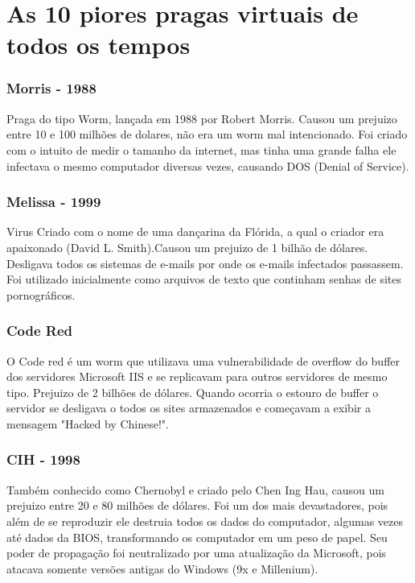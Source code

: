 \chapter{As 10 piores pragas virtuais de todos os tempos}

\subsection{Morris - 1988}

	Praga do tipo Worm, lançada em 1988 por Robert Morris. Causou um prejuizo entre 10 e 100 milhões de dolares, não era um worm mal intencionado. Foi criado com o intuito de medir o tamanho da internet, mas tinha uma grande falha ele infectava o mesmo computador diversas vezes, causando DOS (Denial of Service).

\subsection{Melissa - 1999}
	Virus Criado com o nome de uma dançarina da Flórida, a qual o criador era apaixonado (David L. Smith).Causou um prejuizo de 1 bilhão de dólares. Desligava todos os sistemas de e-mails por onde os e-mails infectados passassem. Foi utilizado inicialmente como arquivos de texto que continham senhas de sites pornográficos.

\subsection{Code Red}

	O Code red é um worm que utilizava uma vulnerabilidade de overflow do buffer dos servidores Microsoft IIS e se replicavam para outros servidores de mesmo tipo. Prejuizo de 2 bilhões de dólares. Quando ocorria o estouro de buffer o servidor se desligava o todos os sites armazenados e começavam a exibir a mensagem "Hacked by Chinese!".

\subsection{CIH - 1998}

	Também conhecido como Chernobyl e criado pelo Chen Ing Hau, causou um prejuizo entre 20 e 80 milhões de dólares. Foi um dos mais devastadores, pois além de se reproduzir ele destruia todos os dados do computador, algumas vezes até dados da BIOS, transformando os computador em um peso de papel. Seu poder de propagação foi neutralizado por uma atualização da Microsoft, pois atacava somente versões antigas do Windows (9x e Millenium).

